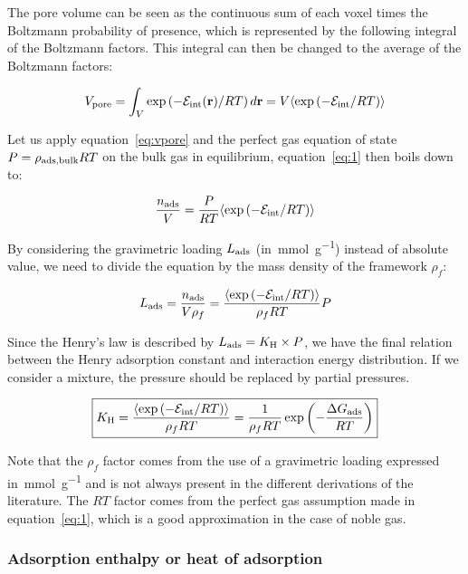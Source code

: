 \documentclass[main.tex]{subfiles}
\begin{document}
The pore volume can be seen as the continuous sum of each voxel times the Boltzmann probability of presence, which is represented by the following integral of the Boltzmann factors. This integral can then be changed to the average of the Boltzmann factors:

\begin{equation}\label{eq:vpore}
    V_{\text{pore}} = \int_V \exp\left(- \mathcal{E}_{\text{int}}(\textbf{r})/RT\right) d\textbf{r} = V \langle \exp\left(-\mathcal{E}_{\text{int}}/RT\right) \rangle
\end{equation}

Let us apply equation~\ref{eq:vpore} and the perfect gas equation of state $P = \rho_{\text{ads,bulk}}RT$ on the bulk gas in equilibrium, equation~\ref{eq:1} then boils down to:

\begin{equation}
    \dfrac{n_{\text{ads}}}{V} = \dfrac{P}{RT} \langle \exp\left(-\mathcal{E}_{\text{int}}/RT\right) \rangle
\end{equation}

By considering the gravimetric loading $L_{\text{ads}}$ (in~\si{\milli\mole\per\gram}) instead of absolute value, we need to divide the equation by the mass density of the framework $\rho_f$:

\begin{equation}
  L_{\text{ads}} = \dfrac{n_{\text{ads}}}{V\rho_f} = \dfrac{\langle \exp\left(-\mathcal{E}_{\text{int}}/RT\right) \rangle}{\rho_f RT} P
\end{equation}

Since the Henry's law is described by $L_{\text{ads}}=K_{\text{H}} \times P$, we have the final relation between the Henry adsorption constant and interaction energy distribution. If we consider a mixture, the pressure should be replaced by partial pressures.

\begin{equation}\label{eq:henry}
    \boxed{
    K_{\text{H}} = \dfrac{\langle \exp\left(-\mathcal{E}_{\text{int}}/RT\right) \rangle}{\rho_f RT} = \dfrac{1}{\rho_f RT} \exp\left(-\dfrac{\Delta G_{\text{ads}}}{RT}\right)
    }
\end{equation}

Note that the $\rho_f$ factor comes from the use of a gravimetric loading expressed in~\si{\milli\mole\per\gram} and is not always present in the different derivations of the literature.\autocite{PoreBlazer} The $RT$ factor comes from the perfect gas assumption made in equation~\ref{eq:1}, which is a good approximation in the case of noble gas. 


\subsubsection{Adsorption enthalpy or heat of adsorption}
\end{document}
